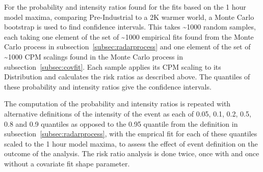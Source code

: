 For the probability and intensity ratios found for the fits based on the 1 hour model maxima,
    comparing Pre-Industrial to a 2K warmer world,
    a Monte Carlo bootstrap is used to find confidence intervals.
This takes \textasciitilde1000 random samples, each taking one element of the set of \textasciitilde1000 empirical fits found from the Monte Carlo process in subsection~\ref{subsec:radarprocess}
    and one element of the set of \textasciitilde1000 CPM scalings found in the Monte Carlo process in subsection~\ref{subsec:covfit}.
Each sample applies its CPM scaling to its Distribution and calculates the risk ratios as described above.
The quantiles of these probability and intensity ratios give the confidence intervals.

The computation of the probability and intensity ratios is repeated with alternative definitions of the intensity of the event
    as each of 0.05, 0.1, 0.2, 0.5, 0.8 and 0.9 quantiles as opposed to the 0.95 quantile from the definition in subsection~\ref{subsec:radarprocess},
    with the emprical fit for each of these quantiles scaled to the 1 hour model maxima,
    to assess the effect of event definition on the outcome of the analysis.
The risk ratio analysis is done twice, once with and once without a covariate fit shape parameter.